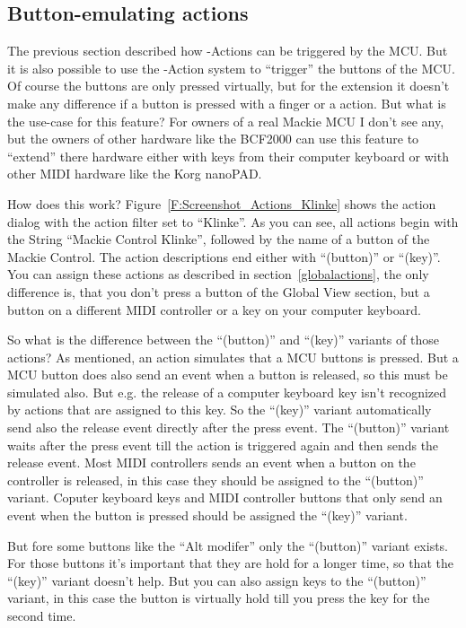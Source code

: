 \subsection{Button-emulating actions}\label{buttonactions}

The previous section described how \reaper-Actions can be triggered
by the MCU. But it is also possible to use the \reaper-Action
system to ``trigger'' the buttons of the MCU. Of course the buttons
are only pressed virtually, but for the \mcu extension it doesn't make
any difference if a button is pressed with a finger or a \reaper
action. But what is the use-case for this feature? For owners of a
real Mackie MCU I don't see any, but the owners of other hardware like
the BCF2000 can use this feature to ``extend'' there hardware either
with keys from their computer keyboard or with other MIDI hardware
like the Korg nanoPAD.


How does this work? Figure~\ref{F:Screenshot_Actions_Klinke} shows the
action dialog with the action filter set to ``Klinke''. As you can
see, all actions begin with the String ``Mackie Control Klinke'',
followed by the name of a button of the Mackie Control. The action
descriptions end either with ``(button)'' or ``(key)''. You can assign
these actions as described in section~\ref{globalactions}, the only
difference is, that you don't press a button of the Global View
section, but a button on a different MIDI controller or a key on your
computer keyboard. 

So what is the difference between the ``(button)'' and ``(key)''
variants of those actions? As mentioned, an action simulates that
a MCU buttons is pressed. But a MCU button does also send an event
when a button is released, so this must be simulated also. But
e.g. the release of a computer keyboard key isn't recognized by
actions that are assigned to this key. So the ``(key)'' variant
automatically send also the release event directly after the press
event. The ``(button)'' variant waits after the press event till the
action is triggered again and then sends the release event. Most MIDI
controllers sends an event when a button on the controller is released,
in this case they should be assigned to the ``(button)''
variant. Coputer keyboard keys and MIDI controller buttons that only send an
event when the button is pressed should be assigned the ``(key)'' variant.

But fore some buttons like the ``Alt modifer'' only the ``(button)''
variant exists. For those buttons it's important that they are hold
for a longer time, so that the ``(key)'' variant doesn't help. But you
can also assign keys to the ``(button)'' variant, in this case the
button is virtually hold till you press the key for the second time.

